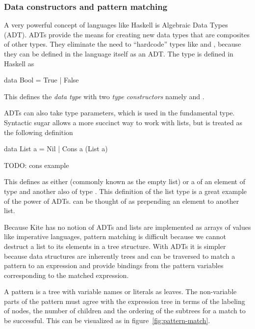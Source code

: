 \subsubsection{Data constructors and pattern matching}
A very powerful concept of languages like Haskell is Algebraic Data Types (ADT). ADTs provide the means for creating new data types that are composites of other types. They eliminate the need to ``hardcode'' types like  and , because they can be defined in the language itself as an ADT. The  type is defined in Haskell as

\begin{haskell}
data Bool = True | False
\end{haskell}

This defines the \emph{data type}  with two \emph{type constructors} namely  and .

ADTs can also take type parameters, which is used in the fundamental  type. Syntactic sugar allows a more succinct way to work with lists, but is treated as the following definition

\begin{haskell}
data List a = Nil | Cons a (List a)
\end{haskell}
TODO: cons example

This defines  as either  (commonly known as the empty list) or a  of an element of type  and another  also of type . This definition of the list type is a great example of the power of ADTs.  can be thought of as prepending an element to another list.

Because Kite has no notion of ADTs and lists are implemented as arrays of values like imperative languages, pattern matching is difficult because we cannot destruct a list to its elements in a tree structure. With ADTs it is simpler because data structures are inherently trees and can be traversed to match a pattern to an expression and provide bindings from the pattern variables corresponding to the matched expression.

A pattern is a tree with variable names or literals as leaves. The non-variable parts of the pattern must agree with the expression tree in terms of the labeling of nodes, the number of children and the ordering of the subtrees\cite[p. 514]{wilhelm95} for a match to be successful. This can be visualized as in figure~\ref{fig:pattern-match}.

